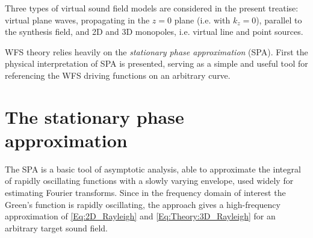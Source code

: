 \documentclass[12pt,a4paper]{article}
\begin{document}
\vspace{3mm}
Three types of virtual sound field models are considered in the present treatise: virtual plane waves, propagating in the $z=0$ plane (i.e. with $k_z = 0$), parallel to the synthesis field, and 2D and 3D monopoles, i.e. virtual line and point sources.

\vspace{3mm}
WFS theory relies heavily on the \emph{stationary phase approximation} (SPA). First the physical interpretation of SPA is presented, serving as a simple and useful tool for referencing the WFS driving functions on an arbitrary curve.

\section{The stationary phase approximation}

The SPA is a basic tool of asymptotic analysis, able to approximate the integral of rapidly oscillating functions with a slowly varying envelope, used widely for estimating Fourier transforms.
Since in the frequency domain of interest the Green's function is rapidly oscillating, the approach gives a high-frequency approximation of \eqref{Eq:2D_Rayleigh} and \eqref{Eq:Theory:3D_Rayleigh} for an arbitrary target sound field.
\end{document}
